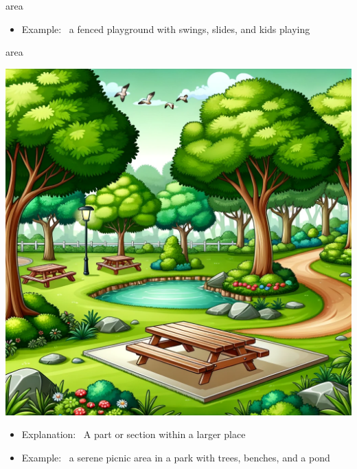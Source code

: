 \documentclass[avery5371, grid,frame]{flashcards}
\begin{document}
\begin{flashcard}{area}
\begin{center}
\begin{minipage}[c]{.45\textwidth}
\begin{itemize}
            \item Example: \ a fenced playground with swings, slides, and kids playing
            \end{itemize}
        \end{minipage}
    \end{center}
    \vspace*{\fill}
\end{flashcard}\begin{flashcard}{area}
    \vspace*{\fill}
    \begin{center}
        \begin{minipage}[c]{.45\textwidth}
            \includegraphics[width=\textwidth]{cards/a/area/area - a serene picnic area in a park with trees, benches, and a pond.png}
        \end{minipage}
        \begin{minipage}[c]{.45\textwidth}
            \begin{itemize}\setlength\itemsep{12pt}
            \item Explanation: \ A part or section within a larger place

            \item Example: \ a serene picnic area in a park with trees, benches, and a pond
            \end{itemize}
        \end{minipage}
    \end{center}
    \vspace*{\fill}
\end{flashcard}
\end{document}
